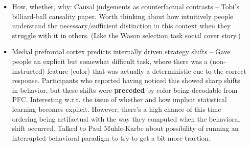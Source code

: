 \documentclass[10pt]{article}
\begin{document}
\begin{itemize}
\item How, whether, why: Causal judgements as counterfactual contrasts -- Tobi's billiard-ball causality paper. Worth thinking about how intuitively people understand the necessary/sufficient distinction in this context when they struggle with it in others. (Like the Wason selection task social cover story.) \citep{Gerstenberg2015} \par
\item Medial prefrontal cortex predicts internally driven strategy shifts -- Gave people an explicit but somewhat difficult task, where there was a (non-instructed) feature (color) that was actually a deterministic cue to the correct response. Participants who reported having noticed this showed sharp shifts in behavior, but these shifts were \textbf{preceded} by color being decodable from PFC. Interesting w.r.t. the issue of whether and how implicit statistical learning becomes explicit. However, there's a high chance of this time ordering being artifactual with the way they computed when the behavioral shift occurred. Talked to Paul Muhle-Karbe about possibility of running an interrupted behavioral paradigm to try to get a bit more traction. \citep{Schuck2015} \par
\end{itemize}
\end{document}
